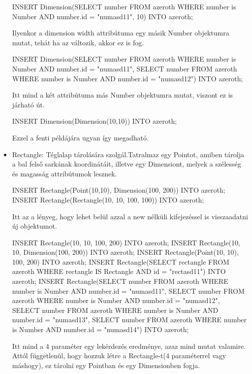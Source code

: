 \begin{itemize}
\begin{sql}
INSERT Dimension(SELECT number FROM azeroth WHERE number is Number AND number.id = "numasd11", 10) INTO azeroth;
\end{sql}

Ilyenkor a dimension width attribútuma egy másik Number objektumra mutat, tehát ha az változik, akkor ez is fog.

\begin{sql}
INSERT Dimension(SELECT number FROM azeroth WHERE number is Number AND number.id = "numasd11", SELECT number FROM azeroth WHERE number is Number AND number.id = "numasd12") INTO azeroth;
\end{sql}

Itt mind a két attribútuma más Number objektumra mutat, viszont ez is járható út.
\begin{sql}
INSERT Dimension(Dimension(10,10)) INTO azeroth;
\end{sql}

Ezzel a fenti példájára ugyan így megadható.

\item Rectangle: Téglalap tárolására szolgál.Tatralmaz egy Pointot, amiben tárolja a bal felső sarkának koordinátáit, illetve egy Dimensiont, melyek a szélesség és magasság attribútumok lesznek.

\begin{sql}
INSERT Rectangle(Point(10,10), Dimension(100, 200)) INTO azeroth;
INSERT Rectangle(Rectangle(10, 10, 100, 100)) INTO azeroth;
\end{sql}

Itt az a lényeg, hogy lehet belül azzal a new nélküli kifejezéssel is visszaadatni új objektumot.

\begin{sql}
INSERT Rectangle(10, 10, 100, 200) INTO azeroth;
INSERT Rectangle(10, 10, Dimension(100, 200)) INTO azeroth;
INSERT Rectangle(Point(10, 10), 100, 200) INTO azeroth;
INSERT Rectangle(SELECT rectangle FROM azeroth WHERE rectangle IS Rectangle AND id = "rectasd11") INTO azeroth;
INSERT Rectangle(SELECT number FROM azeroth WHERE number is Number AND number.id = "numasd11", SELECT number FROM azeroth WHERE number is Number AND number.id = "numasd12", SELECT number FROM azeroth WHERE number is Number AND number.id = "numasd13", SELECT number FROM azeroth WHERE number is Number AND number.id = "numasd14") INTO azeroth;
\end{sql}

Itt mind a 4 paraméter egy lekérdezés eredménye, azaz mind mutat valamire.
Attól függetlenül, hogy hozzuk létre a Rectangle-t(4 paraméterrel vagy máshogy),  ez tárolni egy Pointban és egy Dimensionben fogja.


\end{itemize}
